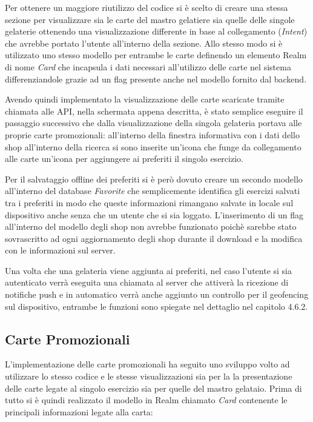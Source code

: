 Per ottenere un maggiore riutilizzo del codice si è scelto di creare
una stessa sezione per visualizzare sia le carte del mastro gelatiere
sia quelle delle singole gelaterie ottenendo una visualizzazione differente
in base al collegamento (\emph{Intent}) che avrebbe portato l'utente
all'interno della sezione. Allo stesso modo si è utilizzato uno stesso
modello per entrambe le carte definendo un elemento Realm di nome
\emph{Card} che incapsula i dati necessari all'utilizzo delle carte
nel sistema differenziandole grazie ad un flag presente anche nel
modello fornito dal backend.

Avendo quindi implementato la visualizzazione delle carte scaricate
tramite chiamata alle API, nella schermata appena descritta, è stato
semplice eseguire il passaggio successivo che dalla visualizzazione
della singola gelateria portava alle proprie carte promozionali: all'interno
della finestra informativa con i dati dello shop all'interno della
ricerca si sono inserite un'icona che funge da collegamento alle carte
un'icona per aggiungere ai preferiti il singolo esercizio.

Per il salvataggio offline dei preferiti si è però dovuto creare un
secondo modello all'interno del database \emph{Favorite} che semplicemente
identifica gli esercizi salvati tra i preferiti in modo che queste
informazioni rimangano salvate in locale sul dispositivo anche senza
che un utente che si sia loggato. L'inserimento di un flag all'interno
del modello degli shop non avrebbe funzionato poichè sarebbe stato
sovrascritto ad ogni aggiornamento degli shop durante il download
e la modifica con le informazioni sul server.

Una volta che una gelateria viene aggiunta ai preferiti, nel caso
l'utente si sia autenticato verrà eseguita una chiamata al server
che attiverà la ricezione di notifiche push e in automatico verrà
anche aggiunto un controllo per il geofencing sul dispositivo, entrambe
le funzioni sono spiegate nel dettaglio nel capitolo 4.6.2.

\subsection{Carte Promozionali}

L'implementazione delle carte promozionali ha seguito uno sviluppo
volto ad utilizzare lo stesso codice e le stesse visualizzazioni sia
per la la presentazione delle carte legate al singolo esercizio sia
per quelle del mastro gelataio. Prima di tutto si è quindi realizzato
il modello in Realm chiamato \emph{Card} contenente le principali
informazioni legate alla carta: 

